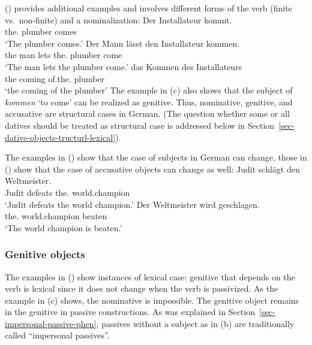 () provides additional examples and involves different forms of the verb (finite
vs.\ non-finite) and a nominalization:
\eal
\ex 
\gll Der Installateur kommt.\\
     the.\NOM{} plumber      comes\\
\glt `The plumber comes.'
\ex 
\gll Der Mann lässt den Installateur kommen.\\
     the man  lets the.\ACC{} plumber      come\\
\glt `The man lets the plumber come.'
\ex 
\gll das Kommen des Installateurs\\
     the coming of.the.\GEN{} plumber\\
\glt `the coming of the plumber'
\zl
The example in (c) also shows that the subject of \emph{kommen} `to come' can be realized as
genitive. Thus, nominative, genitive, and accusative are structural cases in German. (The question
whether some or all datives should be treated as structural case is addressed below in Section~\ref{sec-dative-objects-tructurl-lexical}).

The examples in () show that the case of subjects in German can change, those in ()
show that the case of accusative objects can change as well:
\eal
\ex 
\gll Judit schlägt den Weltmeister.\\
     Judit defeats the.\ACC{} world.champion\\
\glt `Judit defeats the world champion.'
\ex 
\gll Der        Weltmeister    wird   geschlagen.\\
     the.\NOM{} world.champion \AUX{} beaten\\
\glt `The world champion is beaten.'
\zl

\subsubsection{Genitive objects}

The examples in () show instances of lexical case: genitive that depends on the verb is
lexical since it does not change when the verb is passivized.
\eal
{}
\zl
As the example in (c) shows, the nominative is impossible. The genitive object remains in the
genitive in passive constructions. As was explained in Section~\ref{sec-impersonal-passive-phen},
passives without a subject as in (b) are traditionally called ``impersonal passives''.

